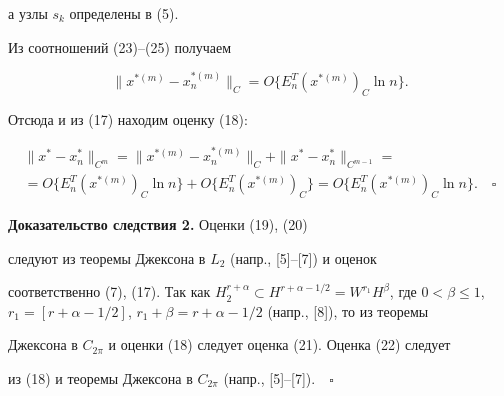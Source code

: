а узлы $s_k$ определены в (5).





Из соотношений (23)--(25) получаем


$$


\| x^{*(m)} - x_n^{*(m)} \|_{C}=O \lbrace E_n^T


(x^{*(m)})_{C} \ln n \rbrace.


$$


Отсюда и из (17) находим оценку (18):


\begin{multline*}


\| x^* - x_n^* \|_{C^m}=\| x^{*(m)} - x_n^{*(m)} \|_{C} +


\| x^* - x_n^* \|_{C^{m-1}}=\\


%


=O \lbrace E_n^{T}(x^{*(m)})_{C} \ln n \rbrace + O \lbrace E_n^T(x^{*(m)})


_{C} \rbrace=O \lbrace E_n^T(x^{*(m)})_{C} \ln n \rbrace.\quad\square


\end{multline*}





{\bf Доказательство следствия 2.} Оценки (19), (20)


следуют из теоремы Джексона в $L_2$ (напр., [5]--[7]) и оценок


соответственно (7), (17). Так как $ H_2^{r + \alpha} \subset H^{r+ \alpha -


1/2}=W^{r_1} H^{\beta}$, где $0 < \beta \leq 1$, $r_{1}=[r + \alpha


- 1/2]$, $r_{1} + \beta=r + \alpha - 1/2$ (напр., [8]), то из теоремы


Джексона в $C_{2 \pi} $ и оценки (18) следует оценка (21). Оценка (22) следует


из (18) и теоремы Джексона в $ C_{2 \pi} $ (напр., [5]--[7]).$\quad\square$








